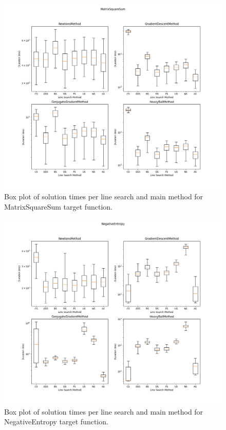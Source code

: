 \documentclass[a4paper,english,titlepage,12pt]{article}
\begin{document}
\begin{figure}[H]
	\centering
	\includegraphics[width=1.0\textwidth]{images/boxplot_mss.png}
	\caption{Box plot of solution times per line search and main method for MatrixSquareSum target function.}
	\label{fig:boxplot_mss}
\end{figure}


\begin{figure}[H]
	\centering
	\includegraphics[width=1.0\textwidth]{images/boxplot_ne.png}
	\caption{Box plot of solution times per line search and main method for NegativeEntropy target function.}
	\label{fig:boxplot_ne}
\end{figure}
\end{document}

